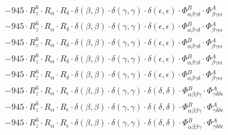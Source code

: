 \documentclass{article}
\begin{document}
\begin{subequations}
\begin{gather}
\begin{array}{c}
 \\[0.2em] 		 - 945 \cdot R_{z}^{6} \cdot R_{\alpha{}} \cdot R_{\delta{}} \cdot \delta{}\left(\beta{}, \beta{}\right) \cdot \delta{}\left(\gamma{}, \gamma{}\right) \cdot \delta{}\left(\epsilon{}, \epsilon{}\right) \cdot \Phi{}^{B}_{\alpha{}\beta{}\gamma{}\delta{}} \cdot \Phi{}^{A}_{\beta{}\gamma{}\epsilon{}\epsilon{}} 
 \\[0.2em] 		 - 945 \cdot R_{z}^{6} \cdot R_{\alpha{}} \cdot R_{\delta{}} \cdot \delta{}\left(\beta{}, \beta{}\right) \cdot \delta{}\left(\gamma{}, \gamma{}\right) \cdot \delta{}\left(\epsilon{}, \epsilon{}\right) \cdot \Phi{}^{B}_{\alpha{}\beta{}\gamma{}\delta{}} \cdot \Phi{}^{A}_{\beta{}\gamma{}\epsilon{}\epsilon{}} 
 \\[0.2em] 		 - 945 \cdot R_{z}^{6} \cdot R_{\alpha{}} \cdot R_{\delta{}} \cdot \delta{}\left(\beta{}, \beta{}\right) \cdot \delta{}\left(\gamma{}, \gamma{}\right) \cdot \delta{}\left(\epsilon{}, \epsilon{}\right) \cdot \Phi{}^{B}_{\alpha{}\beta{}\gamma{}\delta{}} \cdot \Phi{}^{A}_{\beta{}\gamma{}\epsilon{}\epsilon{}} 
 \\[0.2em] 		 - 945 \cdot R_{z}^{6} \cdot R_{\alpha{}} \cdot R_{\delta{}} \cdot \delta{}\left(\beta{}, \beta{}\right) \cdot \delta{}\left(\gamma{}, \gamma{}\right) \cdot \delta{}\left(\epsilon{}, \epsilon{}\right) \cdot \Phi{}^{B}_{\alpha{}\beta{}\gamma{}\delta{}} \cdot \Phi{}^{A}_{\beta{}\gamma{}\epsilon{}\epsilon{}} 
 \\[0.2em] 		 - 945 \cdot R_{z}^{6} \cdot R_{\alpha{}} \cdot R_{\delta{}} \cdot \delta{}\left(\beta{}, \beta{}\right) \cdot \delta{}\left(\gamma{}, \gamma{}\right) \cdot \delta{}\left(\epsilon{}, \epsilon{}\right) \cdot \Phi{}^{B}_{\alpha{}\beta{}\gamma{}\delta{}} \cdot \Phi{}^{A}_{\beta{}\gamma{}\epsilon{}\epsilon{}} 
 \\[0.2em] 		 - 945 \cdot R_{z}^{6} \cdot R_{\alpha{}} \cdot R_{\epsilon{}} \cdot \delta{}\left(\beta{}, \beta{}\right) \cdot \delta{}\left(\gamma{}, \gamma{}\right) \cdot \delta{}\left(\delta{}, \delta{}\right) \cdot \Phi{}^{B}_{\alpha{}\beta{}\beta{}\gamma{}} \cdot \Phi{}^{A}_{\gamma{}\delta{}\delta{}\epsilon{}} 
 \\[0.2em] 		 - 945 \cdot R_{z}^{6} \cdot R_{\alpha{}} \cdot R_{\epsilon{}} \cdot \delta{}\left(\beta{}, \beta{}\right) \cdot \delta{}\left(\gamma{}, \gamma{}\right) \cdot \delta{}\left(\delta{}, \delta{}\right) \cdot \Phi{}^{B}_{\alpha{}\beta{}\beta{}\gamma{}} \cdot \Phi{}^{A}_{\gamma{}\delta{}\delta{}\epsilon{}} 
 \\[0.2em] 		 - 945 \cdot R_{z}^{6} \cdot R_{\alpha{}} \cdot R_{\epsilon{}} \cdot \delta{}\left(\beta{}, \beta{}\right) \cdot \delta{}\left(\gamma{}, \gamma{}\right) \cdot \delta{}\left(\delta{}, \delta{}\right) \cdot \Phi{}^{B}_{\alpha{}\beta{}\beta{}\gamma{}} \cdot \Phi{}^{A}_{\gamma{}\delta{}\delta{}\epsilon{}} 

\end{array}
\end{gather}
\end{subequations}
\end{document}
